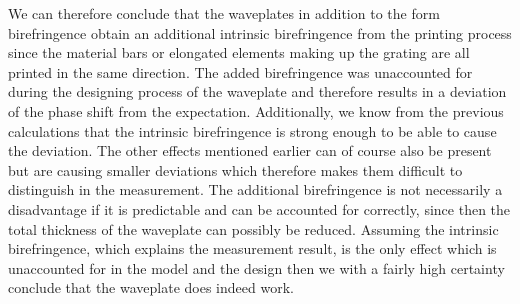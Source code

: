 We can therefore conclude that the waveplates in addition to the form birefringence obtain an additional intrinsic birefringence from the printing process since the material bars or elongated elements making up the grating are all printed in the same direction. The added birefringence was unaccounted for during the designing process of the waveplate and therefore results in a deviation of the phase shift from the expectation. Additionally, we know from the previous calculations that the intrinsic birefringence is strong enough to be able to cause the deviation. The other effects mentioned earlier can of course also be present but are causing smaller deviations which therefore makes them difficult to distinguish in the measurement. The additional birefringence is not necessarily a disadvantage if it is predictable and can be accounted for correctly, since then the total thickness of the waveplate can possibly be reduced. Assuming the intrinsic birefringence, which explains the measurement result, is the only effect which is unaccounted for in the model and the design then we with a fairly high certainty conclude that the waveplate does indeed work. 

